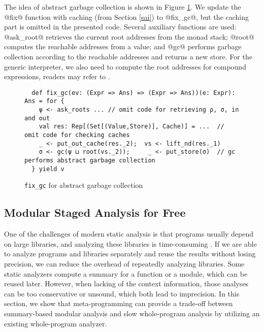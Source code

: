 The idea of abstract garbage collection is shown in Figure \ref{fixgc}. We
update the @fix@ function with caching (from Section \ref{sai}) to @fix_gc@,
but the caching part is omitted in the presented code. Several auxiliary
functions are used: @ask_root@ retrieves the current root addresses from the
monad stack; @root@ computes the reachable addresses from a value; and @gc@
performs garbage collection according to the reachable addresses and returns a new
store. For the generic interpreter, we also need to compute the root addresses
for compound expressions, readers may refer to
\cite{DBLP:journals/pacmpl/DaraisLNH17}.

\begin{figure}[h!]
\begin{lstlisting}
  def fix_gc(ev: (Expr => Ans) => (Expr => Ans))(e: Expr): Ans = for {
    ψ <- ask_roots ... // omit code for retrieving ρ, σ, in and out
    val res: Rep[(Set[(Value,Store)], Cache)] = ...  // omit code for checking caches
    _ <- put_out_cache(res._2);  vs <- lift_nd(res._1)
    σ <- gc(ψ ⊔ root(vs._2));     _ <- put_store(σ)  // gc performs abstract garbage collection
  } yield v
\end{lstlisting}
\caption{\texttt{fix\_gc} for abstract garbage collection} \label{fixgc}
\end{figure}



\subsection{Modular Staged Analysis for Free} \label{modular}

One of the challenges of modern static analysis is that programs usually depend
on large libraries, and analyzing these libraries is time-consuming
\cite{toman_et_al:LIPIcs:2017:7121}.
If we are able to analyze programs and libraries separately and reuse the
results without losing precision, we can reduce the overhead of repeatedly
analyzing libraries. Some static analyzers compute a summary for a function or
a module, which can be reused later. However, when lacking of the context
information, those analyses can be too conservative or unsound, which both lead
to imprecision. In this section, we show that meta-programming can provide a
trade-off between summary-based modular analysis and slow whole-program
analysis by utilizing an existing whole-program analyzer.

